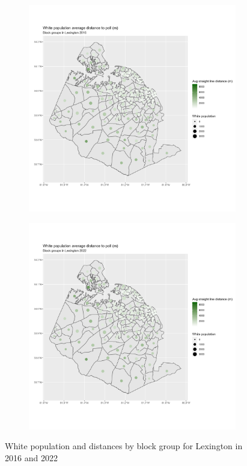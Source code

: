 \documentclass[11pt]{article}
\theoremstyle{remark}
\theoremstyle{definition}
\begin{document}
\begin{figure}
	\begin{subfigure}{.5\textwidth}
		\centering
		\includegraphics[width=\linewidth]{result_analysis/Lexington_SC_original_configs/white_pop_and_dist_Lexington_config_original_2016_polls.png}
		\label{sfig:York_2016_bg_dist_pop}
	\end{subfigure} 
	\begin{subfigure}{.5\textwidth}
		\centering
		\includegraphics[width=\linewidth]{result_analysis/Lexington_SC_original_configs/white_pop_and_dist_Lexington_config_original_2022_polls.png}
		\label{sfig:Lexington_2022_bg_dist}
	\end{subfigure}
	\caption{White population and distances by block group for Lexington in 2016 and 2022}
	\label{fig:Lexington distance White population maps}
\end{figure}
\end{document}
